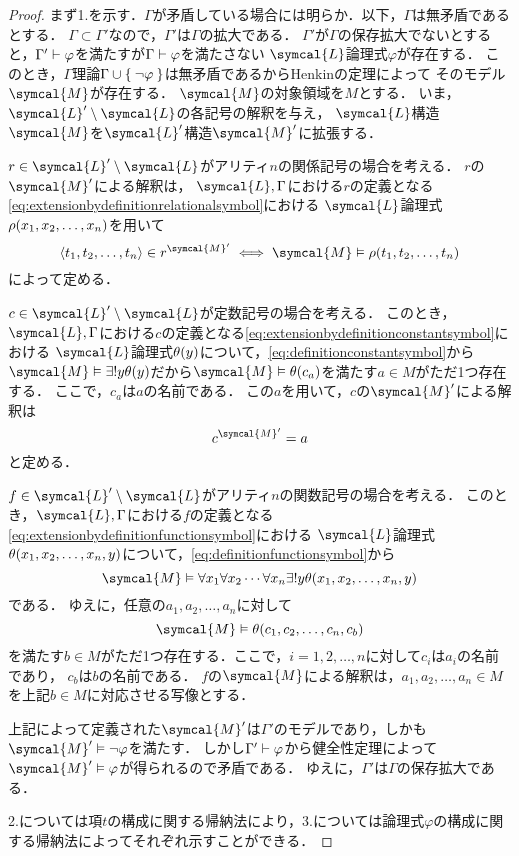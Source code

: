 \begin{proof}
	まず1.を示す．\(\Gamma\)が矛盾している場合には明らか．以下，\(\Gamma\)は無矛盾であるとする．
	\(\Gamma \subset \Gamma'\)なので，\(\Gamma'\)は\(\Gamma\)の拡大である．
	\(\Gamma'\)が\(\Gamma\)の保存拡大でないとすると，\(\Gamma' \vdash \varphi\)を満たすが\(\Gamma \vdash \varphi\)を満たさない
	\(\symcal{L}\)論理式\(\varphi\)が存在する．
	このとき，\(\Gamma\)理論\(\Gamma \cup \Set{\lnot \varphi}\)は無矛盾であるからHenkinの定理によって
	そのモデル\(\symcal{M}\)が存在する．
	\(\symcal{M}\)の対象領域を\(M\)とする．
	いま，\(\symcal{L}' \setminus \symcal{L}\)の各記号の解釈を与え，
	\(\symcal{L}\)構造\(\symcal{M}\)を\(\symcal{L}'\)構造\(\symcal{M}'\)に拡張する．

	\(r \in \symcal{L}' \setminus \symcal{L}\)がアリティ\(n\)の関係記号の場合を考える．
	\(r\)の\(\symcal{M}'\)による解釈は，
	\(\symcal{L}, \Gamma\)における\(r\)の定義となる\cref{eq:extensionbydefinitionrelationalsymbol}における
	\(\symcal{L}\)論理式\(\apply{\rho}{x_1, x_2, \dots, x_n}\)を用いて
	\[
		\pair{t_1, t_2, \dots, t_n} \in \interpretation{\symcal{M}'}{r} \metaequivalent \symcal{M} \satisfy \apply{\rho}{t_1, t_2, \dots, t_n}
	\]
	によって定める．

	\(c \in \symcal{L}' \setminus \symcal{L}\)が定数記号の場合を考える．
	このとき，\(\symcal{L}, \Gamma\)における\(c\)の定義となる\cref{eq:extensionbydefinitionconstantsymbol}における
	\(\symcal{L}\)論理式\(\apply{\theta}{y}\)について，\cref{eq:definitionconstantsymbol}から
	\(\symcal{M} \satisfy \uexists y \apply{\theta}{y}\)だから\(\symcal{M} \satisfy \apply{\theta}{c_a}\)を満たす\(a \in M\)がただ1つ存在する．
	ここで，\(c_a\)は\(a\)の名前である．
	この\(a\)を用いて，\(c\)の\(\symcal{M}'\)による解釈は
	\[
		\interpretation{\symcal{M}'}{c} = a
	\]
	と定める．

	\(f \in \symcal{L}' \setminus \symcal{L}\)がアリティ\(n\)の関数記号の場合を考える．
	このとき，\(\symcal{L}, \Gamma\)における\(f\)の定義となる\cref{eq:extensionbydefinitionfunctionsymbol}における
	\(\symcal{L}\)論理式\(\apply{\theta}{x_1, x_2, \dots, x_n, y}\)について，\cref{eq:definitionfunctionsymbol}から
	\[
		\symcal{M} \satisfy \forall x_1 \forall x_2 \dotsb \forall x_n \uexists y \apply{\theta}{x_1, x_2, \dots, x_n, y}
	\]
	である．
	ゆえに，任意の\(a_1, a_2, \dots, a_n\)に対して
	\[
		\symcal{M} \satisfy \apply{\theta}{c_1, c_2, \dots, c_n, c_b}
	\]
	を満たす\(b \in M\)がただ1つ存在する．ここで，\(i = 1, 2, \dots, n\)に対して\(c_i\)は\(a_i\)の名前であり，
	\(c_b\)は\(b\)の名前である．
	\(f\)の\(\symcal{M}\)による解釈は，\(a_1, a_2, \dots, a_n \in M\)を上記\(b \in M\)に対応させる写像とする．

	上記によって定義された\(\symcal{M}'\)は\(\Gamma'\)のモデルであり，しかも\(\symcal{M}' \satisfy \lnot \varphi\)を満たす．
	しかし\(\Gamma' \vdash \varphi\)から健全性定理によって\(\symcal{M}' \satisfy \varphi\)が得られるので矛盾である．
	ゆえに，\(\Gamma'\)は\(\Gamma\)の保存拡大である．

	2.については項\(t\)の構成に関する帰納法により，3.については論理式\(\varphi\)の構成に関する帰納法によってそれぞれ示すことができる．
\end{proof}

